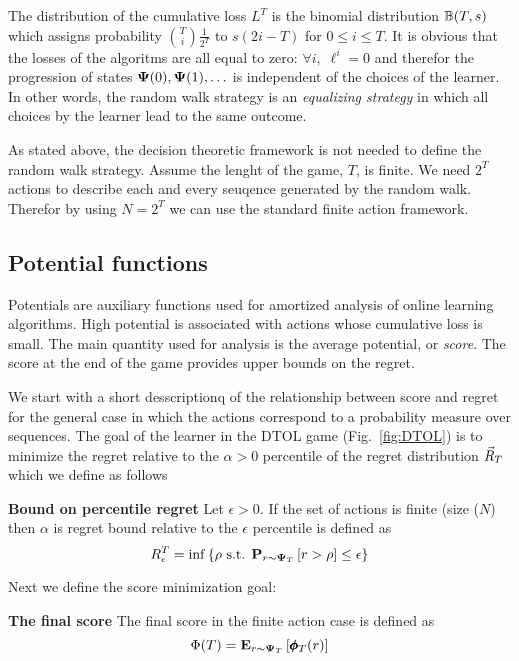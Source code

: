 \documentclass{article}[12pt]
\begin{document}
The distribution of the cumulative loss $L^T$ is the binomial
distribution $\mathbb{B}(T,s)$ which assigns probability
${T \choose i}\frac{1}{2^T}$ to $s(2i-T)$ for $0 \leq i \leq T$.  It
is obvious that the losses of the algoritms are all equal to zero:
$\forall i,\; \ell^i=0$ and therefor the progression of states
${\bf \Psi}(0),{\bf \Psi}(1),\ldots$ is independent of the choices of the
learner. In other words, the random walk strategy is an {\em equalizing
  strategy} in which all choices by the learner lead to the same
outcome.

As stated above, the decision theoretic framework is not needed to
define the random walk strategy. Assume the lenght of the game, $T$,
is finite. We need $2^T$ actions to describe each and every seuqence
generated by the random walk. Therefor by using $N=2^T$ we can use the
standard finite action framework.

\subsection{Potential functions}
Potentials are auxiliary functions used for amortized analysis of
online learning algorithms. High potential is associated with actions
whose cumulative loss is small. The main quantity used for analysis is
the average potential, or {\em score}. The score at the end of the
game provides upper bounds on the regret.

We start with a short desscriptionq of the relationship between score
and regret for the general case in which the actions correspond to a
probability measure over sequences.  The goal of the learner in the
DTOL game (Fig.~\ref{fig:DTOL}) is to minimize the regret relative to
the $\alpha>0$ percentile of the regret distribution $\vec{R}_{T}$ which
we define as follows
\begin{definition}{\bf Bound on percentile regret} Let $\epsilon>0$.
  If the set of actions is finite (size ($N$) then
  $\alpha$ is regret bound relative to the $\epsilon$ percentile is defined as
  \begin{equation} \label{eqn:percentile-bound} R_{\epsilon}^T = \inf
    \left\{\rho \mbox{ s.t. } {\bf P}_{r \sim {\bf \Psi}_T}\left[ r> \rho \right] \leq
      \epsilon \right\}
  \end{equation}
\end{definition}

Next we define the score minimization goal:
\begin{definition}{\bf The final score} \label{def:averagePotential}
  The final score in the finite action case is defined as
  \begin{equation} \label{eqn:potential-bound}
    \Phi(T) = {\bf E}_{r \sim {\bf \Psi}_T}\left[ \pmb{\phi}_{T}(r) \right]
  \end{equation}
\end{definition}
\end{document}
